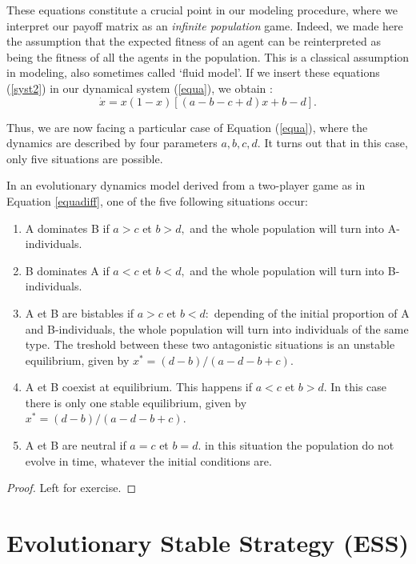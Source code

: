 These equations constitute a crucial point in our modeling procedure, where we interpret our payoff matrix as an \emph{infinite population} game.  Indeed, we made here the assumption that the expected fitness of an agent can be reinterpreted as being the fitness of all the agents in the population.  This is a classical assumption in modeling, also sometimes called `fluid model'.
If we insert these equations (\ref{syst2}) in our dynamical system  (\ref{equa}), we obtain :
\begin{equation}
\dot{x} = x(1-x) \left[ (a-b-c+d)x+b-d\right]. \label{equadiff}
\end{equation}

Thus, we are now facing a particular case of Equation (\ref{equa}), where the dynamics are described by four parameters $a,b,c,d.$
It turns out that in this case, only five situations are possible.
\begin{theorem}
In an evolutionary dynamics model derived from a two-player game as in Equation \eqref{equadiff}, one of the five following situations occur:
\begin{enumerate}
\item A dominates B if $a>c$ et $b>d,$ and the whole population will turn into A-individuals.
\item B dominates A if $a<c$ et $b<d,$ and the whole population will turn into B-individuals.
\item A et B are bistables if $a>c$ et $b<d:$ depending of the initial proportion of A and B-individuals, the whole population will turn into individuals of the same type. The treshold between these two antagonistic situations is an unstable equilibrium, given by $x^*=(d-b)/(a-d-b+c).$ 
\item A et B coexist at equilibrium.  This happens if $a<c$ et $b>d.$  In this case there is only one stable equilibrium, given by $x^*=(d-b)/(a-d-b+c).$ 
\item A et B are neutral if $a=c$ et $b=d.$ in this situation the population do not evolve in time, whatever the initial conditions are.
\end{enumerate}
\end{theorem}
\begin{proof}
Left for exercise.
\end{proof}

\section{Evolutionary Stable Strategy (ESS)}

